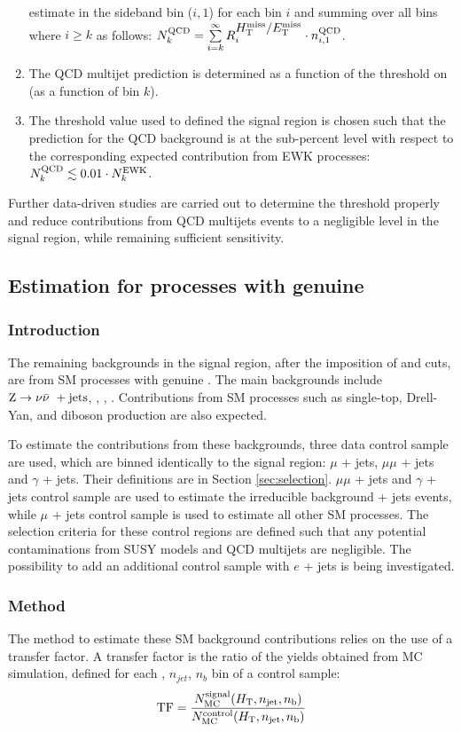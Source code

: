 \begin{enumerate}
  estimate in the \mhtmet sideband bin ($i,1$) for each bin $i$ and
  summing over all bins where $i \geq k$ as follows: $N^{\rm QCD}_{k}
  = \sum\limits^{\infty}_{i=k} R_{i}^{\mbox{$\mbox{$H_{\rm T}^{\rm miss}$} / \mbox{$E_\text{T}^{\rm miss}$}$}} \cdot n^{\rm
    QCD}_{i,1}$.
\item The QCD multijet prediction is determined as a function of the
  threshold on \alphat (\ie as a function of bin $k$).
\item The \alphat threshold value used to defined the signal region is
  chosen such that the prediction for the QCD background is at the
  sub-percent level with respect to the corresponding expected
  contribution from EWK processes: $N^{\rm QCD}_{k} \lesssim 0.01
  \cdot N^{\rm EWK}_{k}$.
\end{enumerate}

Further data-driven studies are carried out to determine the \alphat threshold properly and reduce contributions from QCD multijets events to a negligible level in the signal region, while remaining sufficient sensitivity.

\subsection{Estimation for processes with genuine \met}
\subsubsection{Introduction}
The remaining backgrounds in the signal region, after the imposition of \alphat and \mhtmet cuts, are from SM processes with genuine \met. The main backgrounds include ${\text Z} \rightarrow \nu\bar{\nu}\ + \textrm{jets}$, \wj, \zj, \ttbar. Contributions from SM processes such as single-top, Drell-Yan, and diboson production are also expected.

To estimate the contributions from these backgrounds, three data control sample are used, which are binned identically to the signal region: $\mu$ + jets, $\mu\mu$ + jets and $\gamma$ + jets. Their definitions are in Section \ref{sec:selection}. $\mu\mu$ + jets and $\gamma$ + jets control sample are used to estimate the irreducible background \znunu + jets events, while $\mu$ + jets control sample is used to estimate all other SM processes. The selection criteria for these control regions are defined such that any potential contaminations from SUSY models and QCD multijets are negligible. The possibility to add an additional control sample with $e$ + jets is being investigated.


\subsubsection{Method}
\label{sec:ewk-method}
The method to estimate these SM background contributions relies on the use of a transfer factor. A transfer factor is the ratio of the yields obtained from MC simulation, defined for each \scalht, $n_{jet}$, $n_b$ bin of a control sample:
\begin{equation}
  \label{equ:tf-ratio}
  {\rm TF} = \frac{N_{\rm MC}^{\rm signal}(\mbox{$H_\text{T}$},n_{\text{jet}},n_{\text{b}})}{N_{\rm
      MC}^{\rm control}(\mbox{$H_\text{T}$},n_{\text{jet}},n_{\text{b}})} 
\end{equation}

